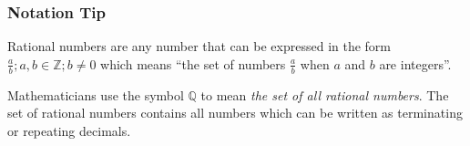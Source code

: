 \label{m38346*secfhsst!!!underscore!!!id2154}
            \subsubsection{  Notation Tip }
            \nopagebreak
        \label{m38346*id178758}Rational numbers are any number that can be expressed
in the form $\frac{a}{b};a,b\in \mathbb{Z};b\ne 0$ which means ``the set of
numbers $\frac{a}{b}$ when $a$ and $b$ are integers''. \par 
        \label{m38346*id178840}Mathematicians use the symbol $\mathbb{Q}$ to mean \textsl{the set of all
rational numbers}. The set of rational numbers contains all numbers which can be
written as terminating or repeating decimals.\par 
\label{m38346*secfhsst!!!underscore!!!id2162}
